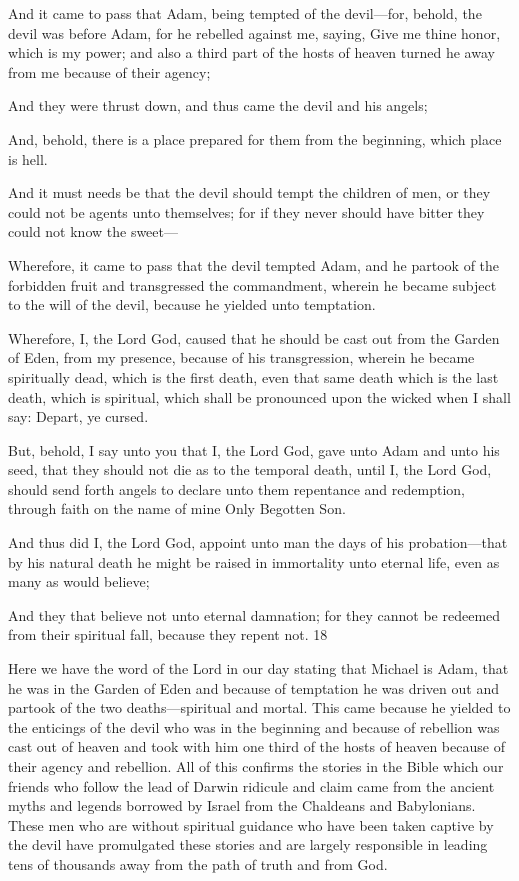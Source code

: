 And it came to pass that Adam, being tempted of the devil—for, behold, the devil was before
Adam, for he rebelled against me, saying, Give me thine honor, which is my power; and also
a third part of the hosts of heaven turned he away from me because of their agency;

And they were thrust down, and thus came the devil and his angels;

And, behold, there is a place prepared for them from the beginning, which place is hell.

And it must needs be that the devil should tempt the children of men, or they could not be
agents unto themselves; for if they never should have bitter they could not know the sweet—

Wherefore, it came to pass that the devil tempted Adam, and he partook of the forbidden fruit
and transgressed the commandment, wherein he became subject to the will of the devil,
because he yielded unto temptation.

Wherefore, I, the Lord God, caused that he should be cast out from the Garden of Eden, from
my presence, because of his transgression, wherein he became spiritually dead, which is the
first death, even that same death which is the last death, which is spiritual, which shall be
pronounced upon the wicked when I shall say: Depart, ye cursed.

But, behold, I say unto you that I, the Lord God, gave unto Adam and unto his seed, that they
should not die as to the temporal death, until I, the Lord God, should send forth angels to
declare unto them repentance and redemption, through faith on the name of mine Only
Begotten Son.

And thus did I, the Lord God, appoint unto man the days of his probation—that by his natural
death he might be raised in immortality unto eternal life, even as many as would believe;

And they that believe not unto eternal damnation; for they cannot be redeemed from their
spiritual fall, because they repent not. 18

Here we have the word of the Lord in our day stating that Michael is Adam, that he was in
the Garden of Eden and because of temptation he was driven out and partook of the two
deaths—spiritual and mortal. This came because he yielded to the enticings of the devil who
was in the beginning and because of rebellion was cast out of heaven and took with him one
third of the hosts of heaven because of their agency and rebellion. All of this confirms the
stories in the Bible which our friends who follow the lead of Darwin ridicule and claim came
from the ancient myths and legends borrowed by Israel from the Chaldeans and Babylonians.
These men who are without spiritual guidance who have been taken captive by the devil have
promulgated these stories and are largely responsible in leading tens of thousands away from
the path of truth and from God.

